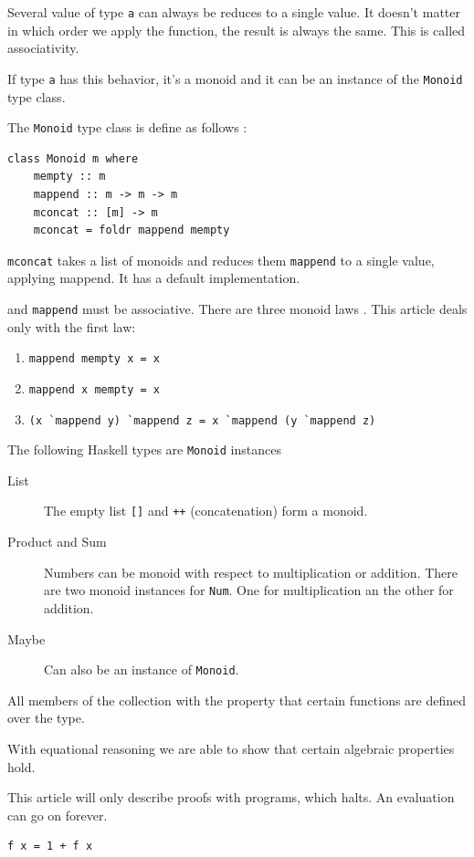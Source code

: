 Several value of type \verb|a| can always be reduces to a single value. It doesn't matter in which order we apply the function, the result is always the same. This is called associativity.

If type \verb|a| has this behavior, it's a monoid and it can be an instance of the \verb|Monoid| type class.


The \verb|Monoid| type class is define as follows \cite{monoid}:
\begin{verbatim}
class Monoid m where
    mempty :: m
    mappend :: m -> m -> m
    mconcat :: [m] -> m
    mconcat = foldr mappend mempty
\end{verbatim}
\verb|mconcat| takes a list of monoids and reduces them \verb|mappend| to a single value, applying mappend. It has a default implementation.

and \verb|mappend| must be associative. There are three monoid laws \cite{monoid}. This article deals only with the first law:

\begin{enumerate}
\item \verb|mappend mempty x = x|
\item \verb|mappend x mempty = x|
\item \verb|(x `mappend y) `mappend z = x `mappend (y `mappend z)|
\end{enumerate}

The following Haskell types are \verb|Monoid| instances
\begin{description}
\item[List] The empty list \verb|[]| and \verb|++| (concatenation) form a monoid.
\item[Product and Sum] Numbers can be monoid with respect to multiplication or addition. There are two monoid instances for \verb|Num|. One for multiplication an the other for addition.
\item[Maybe] Can also be an instance of \verb|Monoid|. 
\end{description}

All members of the collection  with the property that certain functions are defined over the type.

 With equational reasoning we are able to show that certain algebraic properties hold.


This article will only describe proofs with programs, which halts. An evaluation can go on forever.
\begin{verbatim}
f x = 1 + f x
\end{verbatim}

